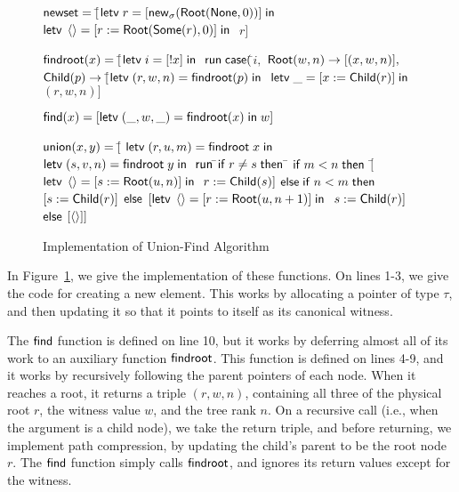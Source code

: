 \begin{figure}
\mbox{}
\begin{specification}
\nextline $\mathsf{newset} = [$\=$\mathsf{letv}\;r = [\mathsf{new}_{\sigma}(\mathsf{Root}(\mathsf{None}, 0))]\;\mathsf{in}\;$
\nextline              \>$\mathsf{letv}\;\left<\right> = [r := \mathsf{Root}(\mathsf{Some}(r), 0)]\;\mathsf{in}\;$
\nextline              \>$r]$

\nextline[1em] $\mathsf{findroot}(x) = [$\=$
                  \mathsf{letv}\;i = [!x]\;\mathsf{in}\;$ 
\nextline \>     $\mathsf{run}\;{}\mathsf{case}($\=$i,$ 
\nextline \> \>     $\mathsf{Root}(w, n) \to [(x, w, n)],$
\nextline \> \>     $\mathsf{Child}(p) \to [$\=$\mathsf{letv}\;(r, w, n) = \mathsf{findroot}(p)\;\mathsf{in}\;$ 
\nextline \> \>                      \>$\mathsf{letv}\;\_ = [x := \mathsf{Child}(r)]\;\mathsf{in}\;$ 
\nextline \> \>                      \>$(r,w,n)]$

\nextline[1em] $\mathsf{find}(x) = [\mathsf{letv}\;(\_, w, \_) = \mathsf{findroot}(x)\;\mathsf{in}\;w]$ 

\nextline[1em] $\mathsf{union}(x, y) = [$\= 
             $\mathsf{letv}\;(r, u, m) = \mathsf{findroot}\;x\;\mathsf{in}\;$ 
\nextline \> $\mathsf{letv}\;(s, v, n) = \mathsf{findroot}\;y\;\mathsf{in}\;$ 
\nextline \> $\mathsf{run}\;{}$\=$\mathsf{if}\;r \not= s\;\mathsf{then}$ 
\nextline \>\>\;\;\=   $\mathsf{if}\;m < n\;\mathsf{then}$ 
\nextline \>\> \>   \;\;$[$\=$\mathsf{letv}\;\left<\right> = [s := \mathsf{Root}(u, n)]\;\mathsf{in}\;$ 
\nextline \>\> \>         \>$r := \mathsf{Child}(s)]$ 
\nextline \>\> \> $\mathsf{else}\;\mathsf{if}\;n < m\;\mathsf{then}$ 
\nextline \>\> \>   \;\;$[s := \mathsf{Child}(r)]$
\nextline \>\> \> $\mathsf{else}$ 
\nextline \>\> \>   \;\;$[\mathsf{letv}\;\left<\right> = [r := \mathsf{Root}(u, n+1)]\;\mathsf{in}\;$
\nextline \>\> \>      \>$s := \mathsf{Child}(r)]$
\nextline \>\> $\mathsf{else}$ 
\nextline \>\> \> $[\left<\right>]]$
\end{specification}
\caption{Implementation of Union-Find Algorithm}
\label{union-find:impl}  
\end{figure}

In Figure~\ref{union-find:impl}, we give the implementation of these functions. 
On lines 1-3, we give the code for creating a new element. This works by allocating
a pointer of type $\tau$, and then updating it so that it points to itself as its
canonical witness. 

The $\mathsf{find}$ function is defined on line 10, but it works by deferring
almost all of its work to an auxiliary function $\mathsf{findroot}$. This
function is defined on lines 4-9, and it works by recursively
following the parent pointers of each node. When it reaches a root, it
returns a triple $(r, w, n)$, containing all three of the physical
root $r$, the witness value $w$, and the tree rank $n$. On a
recursive call (i.e., when the argument is a child node), we take the
return triple, and before returning, we implement path compression, by
updating the child's parent to be the root node $r$.  The $\mathsf{find}$
function simply calls $\mathsf{findroot}$, and ignores its return values
except for the witness.

